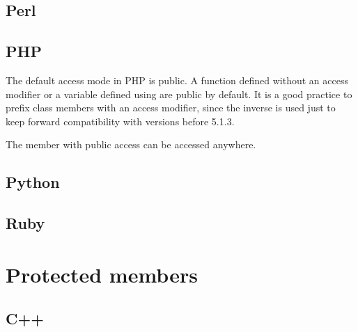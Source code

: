 \documentclass{KodeBook}
\begin{document}
\subsection{Perl}

%

\subsection{PHP}

The default access mode in PHP is public.
A function defined without an access modifier or a variable defined using  are public by default. 
It is a good practice to prefix class members with an access modifier, since the inverse is used just to keep forward compatibility with versions before 5.1.3.



The member with public access can be accessed anywhere.



\subsection{Python}

%

\subsection{Ruby}

%


\section{Protected members}

\subsection{C++}

%
\end{document}

